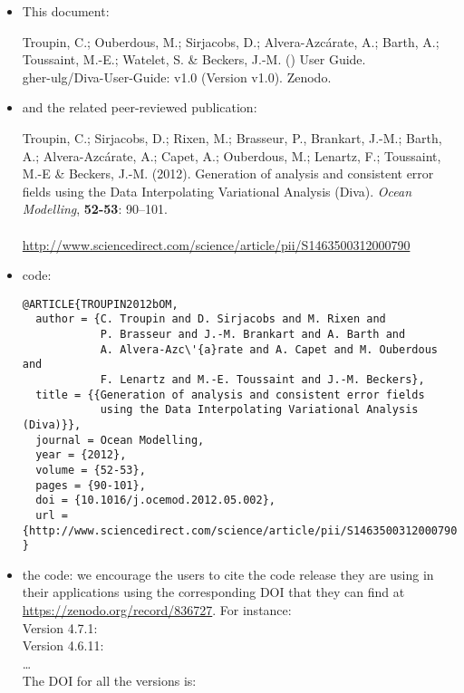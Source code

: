 \begin{itemize}
\item This document:


Troupin, C.; Ouberdous, M.; Sirjacobs, D.; Alvera-Azcárate, A.; Barth, A.; Toussaint, M.-E.; Watelet, S. \& Beckers, J.-M. (\the\year) \diva User Guide.\\
gher-ulg/Diva-User-Guide: v1.0 (Version v1.0). Zenodo. 


\item and the related peer-reviewed publication:


Troupin, C.; Sirjacobs, D.; Rixen, M.; Brasseur, P., Brankart, J.-M.; Barth,
A.; Alvera-Azc\'{a}rate, A.; Capet, A.; Ouberdous, M.; Lenartz, F.;
Toussaint, M.-E \& Beckers, J.-M. (2012).
Generation of analysis and consistent error fields using the Data
Interpolating Variational Analysis (Diva).
\emph{Ocean Modelling}, \textbf{52-53}: 90--101.\\
\\
\url{http://www.sciencedirect.com/science/article/pii/S1463500312000790}

\item[]

{\scriptsize
\BibTeX code:
\begin{verbatim}
@ARTICLE{TROUPIN2012bOM,
  author = {C. Troupin and D. Sirjacobs and M. Rixen and 
            P. Brasseur and J.-M. Brankart and A. Barth and 
            A. Alvera-Azc\'{a}rate and A. Capet and M. Ouberdous and 
            F. Lenartz and M.-E. Toussaint and J.-M. Beckers},
  title = {{Generation of analysis and consistent error fields 
            using the Data Interpolating Variational Analysis (Diva)}},
  journal = Ocean Modelling,
  year = {2012},
  volume = {52-53},
  pages = {90-101},
  doi = {10.1016/j.ocemod.2012.05.002},
  url = {http://www.sciencedirect.com/science/article/pii/S1463500312000790}
}
\end{verbatim}
}

\item the \diva code: we encourage the users to cite the code release they are using in their applications using the corresponding DOI that they can find at \url{https://zenodo.org/record/836727}. For instance:\\
Version 4.7.1: \\
Version 4.6.11: \\
\ldots\\
The DOI for all the versions is: 

\end{itemize}



